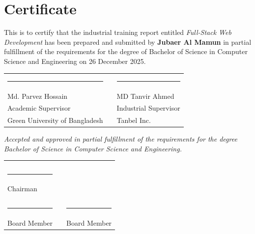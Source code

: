 \chapter*{\centering Certificate}

This is to certify that the industrial training report entitled \textit{Full-Stack Web Development} has been prepared and submitted by \textbf{Jubaer Al Mamun} in partial fulfillment of the requirements for the degree of Bachelor of Science in Computer Science and Engineering on 26 December 2025.

\bigskip
\bigskip
\bigskip
\bigskip

\noindent
\begin{tabular}{p{7cm} p{2cm} p{7cm}}
  \rule{6cm}{1pt} & & \rule{5cm}{1pt} \\
  Md. Parvez Hossain  & & MD Tanvir Ahmed \\
  Academic Supervisor & & Industrial Supervisor \\
  Green University of Bangladesh & & Tanbel Inc. \\
\end{tabular}

\bigskip
\noindent
\begin{center}
    \vspace{0.5cm}
    \textit{Accepted and approved in partial fulfillment of the requirements for the degree\\
    Bachelor of Science in Computer Science and Engineering.}
    \vspace{0.5cm}
\end{center}

\noindent
\begin{tabular}{p{6cm} p{3cm} p{6cm}}
  &  &  \\
  &  &  \\
  \rule{6cm}{1pt} &  & \\
  Chairman \\ \\
  &  &  \\
  \rule{5cm}{1pt} &  & \rule{5cm}{1pt} \\
  Board Member & & Board Member \\
\end{tabular}
